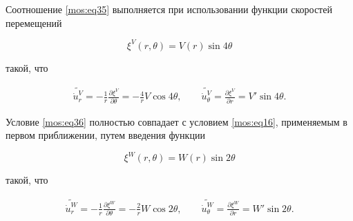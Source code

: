 Соотношение \eqref{mos:eq35} выполняется при использовании функции скоростей перемещений

\begin{equation}

\label{mos:eq38}

\xi^V(r,\theta)=V(r)\sin{4\theta}

\end{equation}

такой, что

\begin{equation}

\label{mos:eq39}

\begin{array}{l}

\widetilde{\dot{u}_r^V}=\displaystyle{-\frac1r\frac{\partial\xi^V}{\partial\theta}=-\frac 4r V \cos{4\theta},

\qquad

\widetilde{\dot{u}_{\theta}^V}=\frac{\partial\xi^V}{\partial r}}=V'\sin{4\theta}.

\end{array}

\end{equation}



Условие \eqref{mos:eq36} полностью совпадает с условием \eqref{mos:eq16}, применяемым в первом приближении, путем введения функции

\begin{equation}

\label{mos:eq40}

\xi^W(r,\theta)=W(r)\sin{2\theta}

\end{equation}

такой, что

\begin{equation}

\label{mos:eq41}

\begin{array}{c}

\widetilde{\dot{u}_r^W}=\displaystyle{-\frac1r\frac{\partial\xi^W}{\partial\theta}=-\frac 2r W \cos{2\theta},

\qquad

\widetilde{\dot{u}_{\theta}^W}=\frac{\partial\xi^W}{\partial r}}=W'\sin{2\theta}.

\end{array}

\end{equation}

